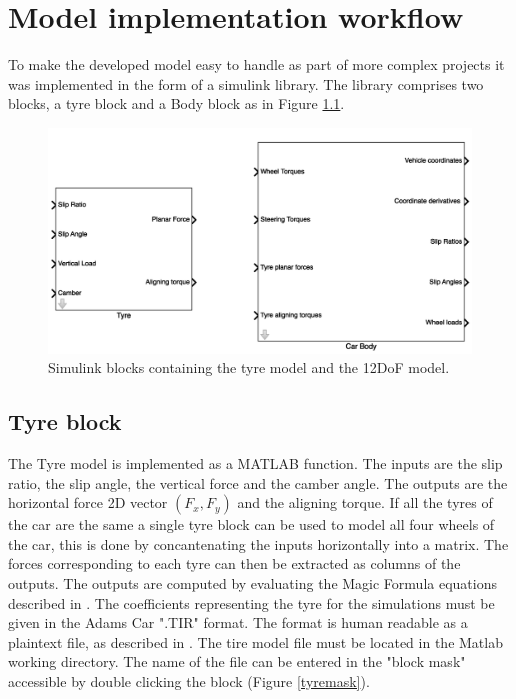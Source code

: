 \chapter{Model implementation workflow}
\label{chap:workflow}
To make the developed model easy to handle as part of more complex projects it was implemented in the form of a simulink library.
The library comprises two blocks, a tyre block and a Body block as in Figure \ref{blocks}.
\begin{figure}[ht]
  \centering
  \includegraphics[scale=0.5]{images/bodyblockmask.png}
  \caption{Simulink blocks containing the tyre model and the 12DoF model.}
  \label{blocks}
\end{figure}

\section{Tyre block}

The Tyre model is implemented as a MATLAB function. The inputs are the slip ratio, the slip angle, the vertical force and the camber angle. The outputs are the horizontal force 2D vector $(F_x, F_y)$ and the aligning torque.
If all the tyres of the car are the same a single tyre block can be used to model all four wheels of the car, this is done by concantenating the inputs horizontally into a matrix. The forces corresponding to each tyre can then be extracted as columns of the outputs.
The outputs are computed by evaluating the Magic Formula equations described in .
The coefficients representing the tyre for the simulations must be given in the Adams Car ".TIR" format. The format is human readable as a plaintext file, as described in .
The tire model file must be located in the Matlab working directory. The name of the file can be entered in the "block mask" accessible by double clicking the block (Figure \ref{tyremask}).

